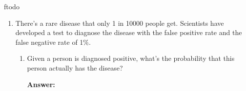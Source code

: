 ƒtodo\documentclass{article}
\newenvironment{QandA}{\begin{enumerate}[label=\arabic*.]}{\end{enumerate}}
\newenvironment{InnerQandA}{\begin{enumerate}[label=\roman*.]}{\end{enumerate}}
\newenvironment{answer}{\par\normalfont \textbf{Answer:}}{}
\newcommand{\g}{\vert}
\begin{document}
\begin{QandA}
\begin{InnerQandA}
        \item Suppose you now get two chips coming from the same company, but you don't know which one. When you test the first chip, it appears to be functioning. What is the probability that the second electronic chip is also good?
        \begin{answer}
            Let us denote the two chips with random variables $c_1$ and $c_2$. Then, we are interested in the probability:
            \begin{align*}
                &p(c_2=1 \g c_1=1) \\
                = &\frac{p(c_2=1, c_1=1)}{p(c_1 = 1)} \\
                = &\frac{p(c_2=1, c_1=1 \g m=A)p(m=A) + p(c_2=1, c_1=1 \g m=B)p(m=B)}{p(c_1 = 1 \g m=A)p(m=A) + p(c_1 = 1 \g m=B)p(m=B)} \\
                = &\frac{p(c_2=1 \g m=A)p(c_1=1 \g m=A)p(m=A) + p(c_2=1 \g m=B)p(c_1=1 \g m=B)p(m=B)}{p(c_1 = 1 \g m=A)p(m=A) + p(c_1 = 1 \g m=B)p(m=B)} &\text{(cond. indep.)}\\
                = &\frac{0.7 \cdot 0.7 \cdot 0.5 + 0.3 \cdot 0.3 \cdot 0.5}{0.7 \cdot 0.5 + 0.3 \cdot 0.5} \\
                = &0.58
            \end{align*}
        \end{answer}
    \end{InnerQandA}
    
    \item There's a rare disease that only 1 in 10000 people get. Scientists have developed a test to diagnose the disease with the false positive rate and the false negative rate of 1\%. 
    \begin{InnerQandA}
        \item Given a person is diagnosed positive, what’s the probability that this person actually has the disease?
        \begin{answer}


\end{answer}
\end{InnerQandA}
\end{QandA}
\end{document}
